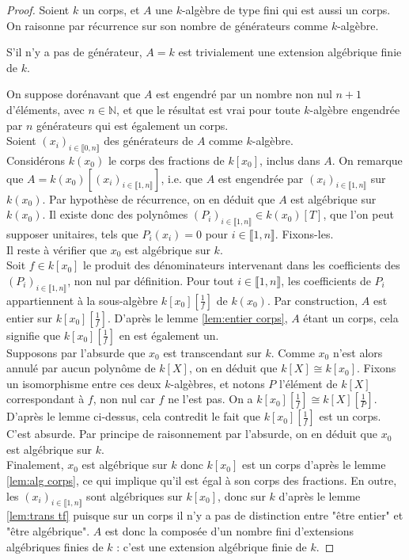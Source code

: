 \documentclass[10pt, twoside]{article}
\theoremstyle{plain}
\theoremstyle{definition}
\theoremstyle{plain}
\theoremstyle{plain}
\theoremstyle{definition}
\theoremstyle{remark}
\begin{document}
\begin{proof}
    Soient $k$ un corps, et $A$ une $k$-algèbre de type fini qui est aussi un corps. On raisonne par récurrence sur son nombre de générateurs comme $k$-algèbre.

    S'il n'y a pas de générateur, $A = k$ est trivialement une extension algébrique finie de $k$. 

    On suppose dorénavant que $A$ est engendré par un nombre non nul $n+1$ d'éléments, avec $n \in \mathbb{N}$, et que le résultat est vrai pour toute $k$-algèbre engendrée par $n$ générateurs qui est également un corps.\\
    Soient $(x_i)_{i \in \llbracket 0, n \rrbracket}$ des générateurs de $A$ comme $k$-algèbre.\\
    Considérons $k(x_0)$ le corps des fractions de $k[x_0]$, inclus dans $A$. On remarque que $A = k(x_0)[(x_i)_{i \in \llbracket 1, n \rrbracket}]$, i.e. que $A$ est engendrée par $(x_i)_{i \in \llbracket 1, n \rrbracket}$ sur $k(x_0)$. Par hypothèse de récurrence, on en déduit que $A$ est algébrique sur $k(x_0)$. Il existe donc des polynômes $(P_i)_{i \in \llbracket 1, n \rrbracket} \in k(x_0)[T]$, que l'on peut supposer unitaires, tels que $P_i(x_i) = 0$ pour $i \in \llbracket 1, n \rrbracket$. Fixons-les.\\
    Il reste à vérifier que $x_0$ est algébrique sur $k$.\\
    Soit $f \in k[x_0]$ le produit des dénominateurs intervenant dans les coefficients des $(P_i)_{i \in \llbracket 1, n \rrbracket}$, non nul par définition. Pour tout $i \in \llbracket 1, n \rrbracket$, les coefficients de $P_i$ appartiennent à la sous-algèbre $k[x_0][\frac{1}{f}]$ de $k(x_0)$. Par construction, $A$ est entier sur $k[x_0][\frac{1}{f}]$. D'après le lemme \ref{lem:entier corps}, $A$ étant un corps, cela signifie que $k[x_0][\frac{1}{f}]$ en est également un.\\
    Supposons par l'absurde que $x_0$ est transcendant sur $k$. Comme $x_0$ n'est alors annulé par aucun polynôme de $k[X]$, on en déduit que $k[X] \cong k[x_0]$. Fixons un isomorphisme entre ces deux $k$-algèbres, et notons $P$ l'élément de $k[X]$ correspondant à $f$, non nul car $f$ ne l'est pas. On a $k[x_0][\frac{1}{f}] \cong k[X][\frac{1}{P}]$. D'après le lemme ci-dessus, cela contredit le fait que $k[x_0][\frac{1}{f}]$ est un corps. C'est absurde. Par principe de raisonnement par l'absurde, on en déduit que $x_0$ est algébrique sur $k$.\\
    Finalement, $x_0$ est algébrique sur $k$ donc $k[x_0]$ est un corps d'après le lemme \ref{lem:alg corps}, ce qui implique qu'il est égal à son corps des fractions. En outre, les $(x_i)_{i \in \llbracket 1, n \rrbracket}$ sont algébriques sur $k[x_0]$, donc sur $k$ d'après le lemme \ref{lem:trans tf} puisque sur un corps il n'y a pas de distinction entre "être entier" et "être algébrique". $A$ est donc la composée d'un nombre fini d'extensions algébriques finies de $k$ : c'est une extension algébrique finie de $k$.
\end{proof}
\end{document}
